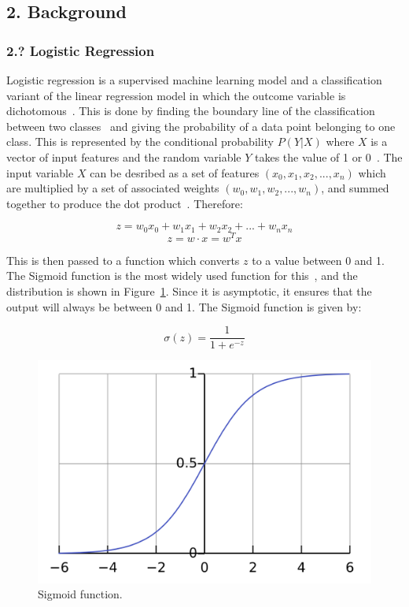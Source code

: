 \documentclass[12pt]{article}
\begin{document}
\newpage
\subsection*{2. Background}
\subsubsection*{2.? Logistic Regression}
Logistic regression is a supervised machine learning model and a classification variant of the linear regression model in which the outcome variable is dichotomous~\cite{Hosmer2013}. This is done by finding the boundary line of the classification between two classes~\cite{Zou2019} and giving the probability of a data point belonging to one class. This is represented by the conditional probability \(P(Y|X)\) where \(X\) is a vector of input features and the random variable \(Y\) takes the value of 1 or 0~\cite{Li2024}. The input variable \(X\) can be desribed as a set of features \((x_0, x_1, x_2, ..., x_n)\) which are multiplied by a set of associated weights \((w_0, w_1, w_2, ..., w_n)\), and summed together to produce the dot product~\cite{Zou2019}. Therefore:

\[z = w_{0}x_{0}+ w_{1}x_{1} + w_{2}x_{2} + ... + w_{n}x_{n}\]
\[z = w \cdot x = w^{T}x\]

This is then passed to a function which converts \(z\) to a value between 0 and 1. The Sigmoid function is the most widely used function for this~\cite{Zou2019}, and the distribution is shown in Figure~\ref{fig:sigmoid}. Since it is asymptotic, it ensures that the output will always be between 0 and 1. The Sigmoid function is given by:

\[\sigma(z) = \frac{1}{1 + e^{-z}}\]

\begin{figure} [H]
  \centering
  \includegraphics[width=0.7\linewidth]{sigmoid}
  \caption{Sigmoid function.}\label{fig:sigmoid}
\end{figure}  
\end{document}
